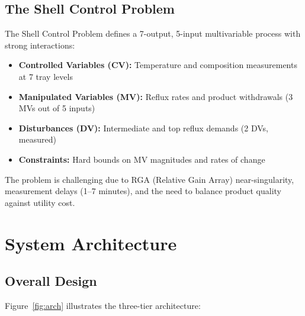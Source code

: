 \documentclass[conference]{IEEEtran}
\begin{document}
\subsection{The Shell Control Problem}

The Shell Control Problem defines a 7-output, 5-input multivariable process with strong interactions:
\begin{itemize}
\item \textbf{Controlled Variables (CV):} Temperature and composition measurements at 7 tray levels
\item \textbf{Manipulated Variables (MV):} Reflux rates and product withdrawals (3 MVs out of 5 inputs)
\item \textbf{Disturbances (DV):} Intermediate and top reflux demands (2 DVs, measured)
\item \textbf{Constraints:} Hard bounds on MV magnitudes and rates of change
\end{itemize}

The problem is challenging due to RGA (Relative Gain Array) near-singularity, measurement delays (1--7 minutes), and the need to balance product quality against utility cost.

\section{System Architecture}

\subsection{Overall Design}

Figure~\ref{fig:arch} illustrates the three-tier architecture:
\end{document}
